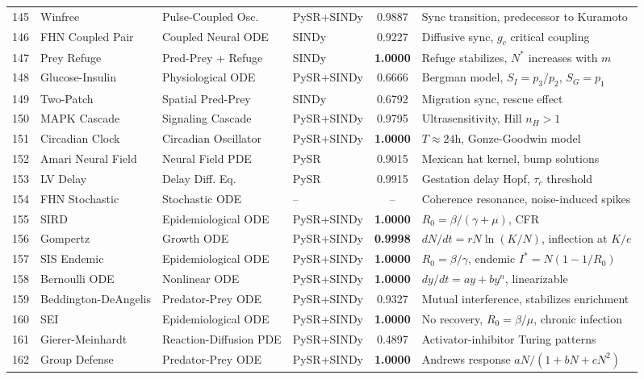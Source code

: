 \begin{table}[t]
\begin{tabular}{rlllcl}
145 & Winfree & Pulse-Coupled Osc. & PySR+SINDy & 0.9887 & Sync transition, predecessor to Kuramoto \\
146 & FHN Coupled Pair & Coupled Neural ODE & SINDy & 0.9227 & Diffusive sync, $g_c$ critical coupling \\
147 & Prey Refuge & Pred-Prey + Refuge & SINDy & \textbf{1.0000} & Refuge stabilizes, $N^*$ increases with $m$ \\
148 & Glucose-Insulin & Physiological ODE & PySR+SINDy & 0.6666 & Bergman model, $S_I = p_3/p_2$, $S_G = p_1$ \\
149 & Two-Patch & Spatial Pred-Prey & SINDy & 0.6792 & Migration sync, rescue effect \\
150 & MAPK Cascade & Signaling Cascade & PySR+SINDy & 0.9795 & Ultrasensitivity, Hill $n_H > 1$ \\
151 & Circadian Clock & Circadian Oscillator & PySR+SINDy & \textbf{1.0000} & $T \approx 24$h, Gonze-Goodwin model \\
152 & Amari Neural Field & Neural Field PDE & PySR & 0.9015 & Mexican hat kernel, bump solutions \\
153 & LV Delay & Delay Diff. Eq. & PySR & 0.9915 & Gestation delay Hopf, $\tau_c$ threshold \\
154 & FHN Stochastic & Stochastic ODE & -- & -- & Coherence resonance, noise-induced spikes \\
155 & SIRD & Epidemiological ODE & PySR+SINDy & \textbf{1.0000} & $R_0 = \beta/(\gamma+\mu)$, CFR \\
156 & Gompertz & Growth ODE & PySR+SINDy & \textbf{0.9998} & $dN/dt = rN\ln(K/N)$, inflection at $K/e$ \\
157 & SIS Endemic & Epidemiological ODE & PySR+SINDy & \textbf{1.0000} & $R_0 = \beta/\gamma$, endemic $I^* = N(1-1/R_0)$ \\
158 & Bernoulli ODE & Nonlinear ODE & PySR+SINDy & \textbf{1.0000} & $dy/dt = ay + by^n$, linearizable \\
159 & Beddington-DeAngelis & Predator-Prey ODE & PySR+SINDy & 0.9327 & Mutual interference, stabilizes enrichment \\
160 & SEI & Epidemiological ODE & PySR+SINDy & \textbf{1.0000} & No recovery, $R_0 = \beta/\mu$, chronic infection \\
161 & Gierer-Meinhardt & Reaction-Diffusion PDE & PySR+SINDy & 0.4897 & Activator-inhibitor Turing patterns \\
162 & Group Defense & Predator-Prey ODE & PySR+SINDy & \textbf{1.0000} & Andrews response $aN/(1+bN+cN^2)$ \\

\end{tabular}
\end{table}
